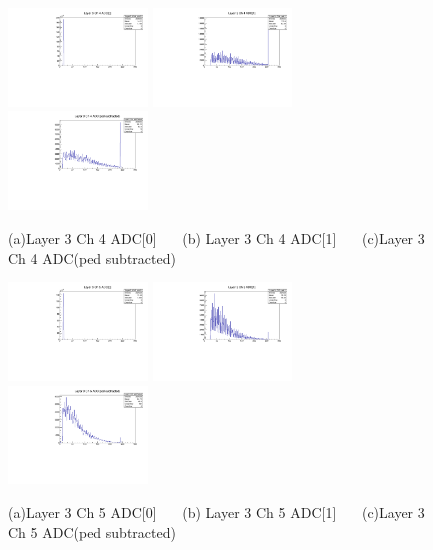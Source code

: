 \documentclass[a4paper,11pt]{article}
\theoremstyle{mytheor}
\begin{document}
\clearpage 
\begin{figure}[H] 
\vspace*{-0.3cm} 
\includegraphics[width=0.33\textwidth,scale=0.5,trim=0 0 0 0,clip]{plotsdir/file0_test-Layer3_Ch4_adc0-1.pdf} 
\includegraphics[width=0.33\textwidth,scale=0.5,trim=0 0 0 0,clip]{plotsdir/file0_test-Layer3_Ch4_adc1-1.pdf} 
\includegraphics[width=0.33\textwidth,scale=0.5,trim=0 0 0 0,clip]{plotsdir/file0_test-Layer3_Ch4_adcPedsub-1.pdf} 
\caption{(a)Layer 3 Ch 4 ADC[0] ~~~(b) Layer 3 Ch 4 ADC[1] ~~~(c)Layer 3 Ch 4 ADC(ped subtracted) } 
\end{figure} 
\begin{figure}[H] 
\vspace*{-0.3cm} 
\includegraphics[width=0.33\textwidth,scale=0.5,trim=0 0 0 0,clip]{plotsdir/file0_test-Layer3_Ch5_adc0-1.pdf} 
\includegraphics[width=0.33\textwidth,scale=0.5,trim=0 0 0 0,clip]{plotsdir/file0_test-Layer3_Ch5_adc1-1.pdf} 
\includegraphics[width=0.33\textwidth,scale=0.5,trim=0 0 0 0,clip]{plotsdir/file0_test-Layer3_Ch5_adcPedsub-1.pdf} 
\caption{(a)Layer 3 Ch 5 ADC[0] ~~~(b) Layer 3 Ch 5 ADC[1] ~~~(c)Layer 3 Ch 5 ADC(ped subtracted) } 
\end{figure} 
\end{document}
